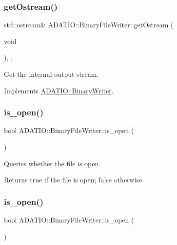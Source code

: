 \subsubsection{\texorpdfstring{getOstream()}{getOstream()}\hspace{0.1cm}{\footnotesize\ttfamily [3/3]}}
{\footnotesize\ttfamily std\+::ostream\& A\+D\+A\+T\+I\+O\+::\+Binary\+File\+Writer\+::get\+Ostream (\begin{DoxyParamCaption}\item[{void}]{ }\end{DoxyParamCaption})\hspace{0.3cm}{\ttfamily [inline]}, {\ttfamily [protected]}, {\ttfamily [virtual]}}



Get the internal output stream. 



Implements \mbox{\hyperlink{classADATIO_1_1BinaryWriter_a4fe227341d17d012bb83a070c208dac0}{A\+D\+A\+T\+I\+O\+::\+Binary\+Writer}}.

\mbox{\label{classADATIO_1_1BinaryFileWriter_a891f81b41b18e3ba86c7e8af134b603e}} 
\subsubsection{\texorpdfstring{is\_open()}{is\_open()}\hspace{0.1cm}{\footnotesize\ttfamily [1/3]}}
{\footnotesize\ttfamily bool A\+D\+A\+T\+I\+O\+::\+Binary\+File\+Writer\+::is\+\_\+open (\begin{DoxyParamCaption}{ }\end{DoxyParamCaption})}



Queries whether the file is open. 

\begin{DoxyReturn}{Returns}
true if the file is open; false otherwise. 
\end{DoxyReturn}
\mbox{\label{classADATIO_1_1BinaryFileWriter_a891f81b41b18e3ba86c7e8af134b603e}} 
\subsubsection{\texorpdfstring{is\_open()}{is\_open()}\hspace{0.1cm}{\footnotesize\ttfamily [2/3]}}
{\footnotesize\ttfamily bool A\+D\+A\+T\+I\+O\+::\+Binary\+File\+Writer\+::is\+\_\+open (\begin{DoxyParamCaption}{ }\end{DoxyParamCaption})}



